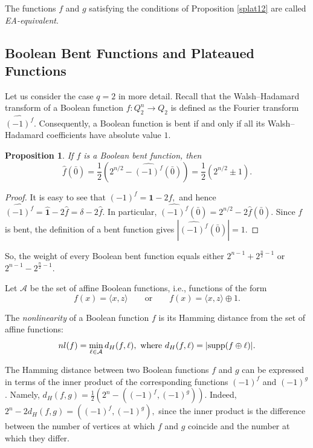 \documentclass[11pt]{article}
\newtheorem{claim}{Proposition}[section]
\theoremstyle{definition}
\newcommand{\supp}{{\rm supp}}
\begin{document}
{{{The functions $f$ and $g$ satisfying the conditions of Proposition \ref{splat12} are called                          {\sl EA-equivalent}.




\subsection{Boolean Bent Functions and Plateaued Functions}

Let us consider the case $q=2$ in more detail. Recall that the Walsh--Hadamard transform of a Boolean function
$f:Q_2^n\to Q_2$ is defined as the Fourier transform
$\widehat{(-1)^f}$.  Consequently, a Boolean function is bent if and only if all its Walsh--Hadamard coefficients have absolute value $1$.

\begin{claim}\label{cl:bentsupp}
If $f$ is a Boolean bent function, then
\[
\widehat f(\bar 0)
=\frac{1}{2}\left(2^{n/2}-\widehat{(-1)^f}(\bar 0)\right)
=\frac{1}{2}\left(2^{n/2}\pm1\right).
\]
\end{claim}

\begin{proof}
It is easy to see that
$(-1)^f=\mathbf{1}-2f,$
and hence
$\widehat{(-1)^f}=\widehat{\mathbf{1}}-2\widehat f
=\delta-2\widehat f$.
In particular,
$\widehat{(-1)^f}(\bar 0)
=2^{n/2}-2\widehat f(\bar 0)$.
Since $f$ is bent, the definition of a bent function gives
$\left|\widehat{(-1)^f}(\bar 0)\right|=1$.
\end{proof}
So, the weight of every Boolean bent function equals either $2^{n-1}+2^{\frac{n}{2}-1}$ or $2^{n-1}-2^{\frac{n}{2}-1}$.

Let $\mathcal A$ be the set of affine Boolean functions, i.e., functions of the form
\[
f(x)=\langle x,z\rangle
\qquad\text{or}\qquad
f(x)=\langle x,z\rangle\oplus1.
\]

The {\sl nonlinearity} of a Boolean function $f$ is its Hamming distance from the set of affine functions:
\[
nl(f)=\min_{\ell\in\mathcal A}d_H(f,\ell),\
\mbox{where}\
d_H(f,\ell)=|\supp(f\oplus\ell)|.
\]

The Hamming distance between two Boolean functions $f$ and $g$ can be expressed in terms of the inner product of the corresponding functions $(-1)^f$ and $(-1)^g$. Namely,
$d_H(f,g)
=\frac12\left(2^n-((-1)^f,(-1)^g)\right).$
Indeed,
$2^n-2d_H(f,g)
=((-1)^f,(-1)^g),$
since the inner product is the difference between the number of vertices at which $f$ and $g$ coincide and the number at which they differ.

}}}
\end{document}
